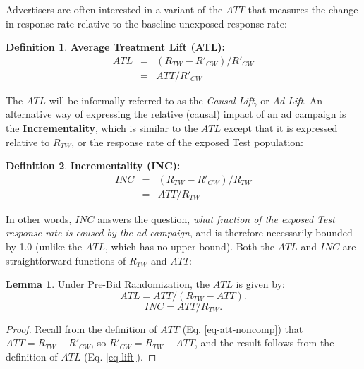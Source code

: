 \documentclass[11pt,a4paper]{article}
\theoremstyle{definition}
\newtheorem{definition}{Definition}[section]
\theoremstyle{remark}
\theoremstyle{definition}
\theoremstyle{definition}
\theoremstyle{definition}
\theoremstyle{definition}
\theoremstyle{definition}
\theoremstyle{definition}
\newtheorem{lemma}[theorem]{Lemma}
\begin{document}
Advertisers are often interested in a variant of the $ATT$ that measures the change in response rate relative to the baseline unexposed response rate:

\begin{definition}\label{def-lift}
	\textbf{Average Treatment Lift (ATL):} 
\begin{eqnarray}
ATL &= & (R_{TW} - R'_{CW})/R'_{CW}\\
    &= & ATT/R'_{CW} 	\label{eq-lift}	
\end{eqnarray}
\end{definition}

The $ATL$ will be informally referred to as the \textit{Causal Lift}, or \textit{Ad Lift}. An alternative way of expressing the relative (causal) impact of an ad campaign is the \textbf{Incrementality}, which is similar to the $ATL$ except that it is expressed relative to $R_{TW}$, or the response rate of the exposed Test population:

\begin{definition}\label{def-inc}
	\textbf{Incrementality (INC):} 
\begin{eqnarray}
INC &= & (R_{TW} - R'_{CW})/R_{TW}\\
    &= & ATT/R_{TW} 	\label{eq-lift}	
\end{eqnarray}
\end{definition}

In other words, $INC$ answers the question, \textit{what fraction of the exposed Test response rate is caused by the ad campaign}, and is therefore necessarily bounded by 1.0 (unlike the $ATL$, which has no upper bound). 
Both the $ATL$ and $INC$ are straightforward functions of $R_{TW}$ and $ATT$:

\begin{lemma} \label{lem-atl-inc}\small
Under Pre-Bid Randomization, the $ATL$ is given by:
\begin{equation} \label{eq-atl}
ATL = ATT/(R_{TW} - ATT).
\end{equation}
\begin{equation} \label{eq-inc}
INC = ATT/R_{TW}.
\end{equation}

\begin{proof}
Recall from the definition of $ATT$ (Eq. \ref{eq-att-noncomp}) that $ATT = R_{TW} - R'_{CW}$, so $R'_{CW} = R_{TW} - ATT$, and the result follows from the definition of $ATL$ (Eq. \ref{eq-lift}).
\end{proof}	
\end{lemma}
\end{document}

